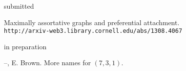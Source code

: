 \documentclass[10pt,a4paper]{article}
\begin{document}
\iffalse


\vspace{.25cm}
{\sc submitted}
\begin{enumerate}[label={[\arabic*]},labelindent=1cm,nolistsep]
\setcounter{enumi}{\value{paper}}
\item
Maximally assortative graphs and preferential attachment.\\ {\tt\small\nolinkurl{http://arxiv-web3.library.cornell.edu/abs/1308.4067}}
\setcounter{paper}{\value{enumi}}
\end{enumerate}

\vspace{.25cm}
{\sc in preparation}
\begin{enumerate}[label={[\arabic*]},labelindent=1cm,nolistsep]
\setcounter{enumi}{\value{paper}}
\item
--, E. Brown. More names for \((7,3,1)\).
\setcounter{paper}{\value{enumi}}
\end{enumerate}


\end{document}
